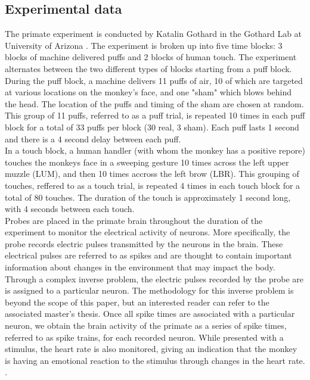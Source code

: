 \documentclass[12pt]{article}
\begin{document}
\subsection{Experimental data}The primate experiment is conducted by Katalin Gothard in the Gothard Lab at University
of Arizona \cite{lab}. The experiment is broken up into five time blocks: 3 blocks of machine delivered puffs and 2 blocks of human touch. The experiment alternates between the two different types of blocks starting from a puff block. During the puff block, a machine delivers 11 puffs of air, 10 of which are targeted at various locations on the monkey's face, and one "sham" which blows behind the head. The location of the puffs and timing of the sham are chosen at random. This group of 11 puffs, referred to as a puff trial, is repeated 10 times in each puff block for a total of 33 puffs per block (30 real, 3 sham). Each puff lasts 1 second and there is a 4 second delay between each puff. \\
\indent In a touch block, a human handler (with whom the monkey has a positive repore) touches the monkeys face in a sweeping gesture 10 times across the left upper muzzle (LUM), and then 10 times accross the left brow (LBR). This grouping of touches, reffered to as a touch trial, is repeated 4 times in each touch block for a total of 80 touches. The duration of the touch is approximately 1 second long, with 4 seconds between each touch.  \\
\indent Probes are placed in the primate brain throughout the duration of the experiment
to monitor the electrical activity of neurons. More specifically, the probe records electric pulses transmitted by the neurons in the brain. These electrical pulses are referred to as spikes and are thought to contain important information about changes in the environment that may impact the body.  Through a complex inverse problem, the electric pulses recorded by the probe are is assigned to a particular
neuron. The methodology for this inverse problem is beyond the scope of this paper,
but an interested reader can refer to the associated master's thesis. Once all spike
times are associated with a particular neuron, we obtain the brain activity of the primate
as a series of spike times, referred to as spike trains, for each recorded neuron. While presented
with a stimulus, the heart rate is also monitored, giving an indication that the monkey is having an emotional reaction to the stimulus through changes in the heart rate. \cite{gothard}. \\
\end{document}
